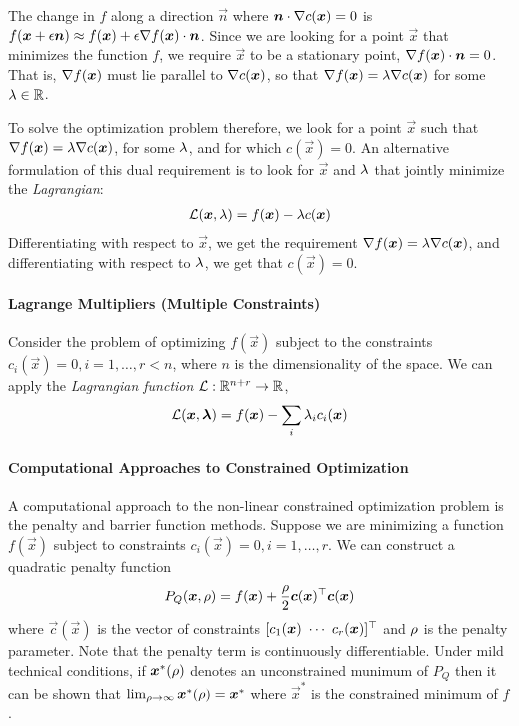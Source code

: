 The change in $f$ along a direction $\vec{n}$ where $\boldsymbol{n}\cdot\nabla c(\boldsymbol{x})=0$ is $f(\boldsymbol{x}+\epsilon\boldsymbol{n})\approx f(\boldsymbol{x})+\epsilon\nabla f(\boldsymbol{x})\cdot\boldsymbol{n}$. Since we are looking for a point $\vec{x}$ that minimizes the function $f$, we require $\vec{x}$ to be a stationary point, $\nabla f(\boldsymbol{x})\cdot\boldsymbol{n}=0$. That is, $\nabla f(\boldsymbol{x})$ must lie parallel to $\nabla c(\boldsymbol{x})$, so that $\nabla f(\boldsymbol{x})=\lambda\nabla c(\boldsymbol{x})$ for some $\lambda\in\mathbb{R}$.

To solve the optimization problem therefore, we look for a point $\vec{x}$ such that $\nabla f(\boldsymbol{x})=\lambda\nabla c(\boldsymbol{x})$, for some $\lambda$, and for which $c(\vec{x})=0$. An alternative formulation of this dual requirement is to look for $\vec{x}$ and $\lambda$ that jointly minimize the \emph{Lagrangian}:
\begin{align*}
	\mathcal{L}(\boldsymbol{x},\lambda)=f(\boldsymbol{x})-\lambda c(\boldsymbol{x})
\end{align*}
Differentiating with respect to $\vec{x}$, we get the requirement $\nabla f(\boldsymbol{x})=\lambda\nabla c(\boldsymbol{x})$, and differentiating with respect to $\lambda$, we get that $c(\vec{x})=0$.

\paragraph{Lagrange Multipliers (Multiple Constraints)}

Consider the problem of optimizing $f(\vec{x})$ subject to the constraints $c_i(\vec{x})=0,i=1,\dotsc,r<n$, where $n$ is the dimensionality of the space. We can apply the \emph{Lagrangian function} $\mathcal{L}:\mathbb{R}^{n+r}\to\mathbb{R}$,
\begin{align*}
	\mathcal{L}(\boldsymbol{x},\boldsymbol{\lambda})=f(\boldsymbol{x})-\sum_i\lambda_ic_i(\boldsymbol{x})
\end{align*}

\paragraph{Computational Approaches to Constrained Optimization}

A computational approach to the non-linear constrained optimization problem is the penalty and barrier function methods. Suppose we are minimizing a function $f(\vec{x})$ subject to constraints $c_i(\vec{x})=0,i=1,\dotsc,r$. We can construct a quadratic penalty function
\begin{align*}
	P_Q(\boldsymbol{x},\rho)=f(\boldsymbol{x})+\frac{\rho}{2}\boldsymbol{c}(\boldsymbol{x}){}^\top\boldsymbol{c}(\boldsymbol{x})
\end{align*}
where $\vec{c}(\vec{x})$ is the vector of constraints $[c_1(\vec{x})\ \cdots\ c_r(\vec{x})]\T$ and $\rho$ is the penalty parameter. Note that the penalty term is continuously differentiable. Under mild technical conditions, if $\boldsymbol{x}^*(\rho)$ denotes an unconstrained munimum of $P_Q$ then it can be shown that $\lim_{\rho\to\infty}\boldsymbol{x}^*(\rho)=\boldsymbol{x}^*$ where $\vec{x}^*$ is the constrained minimum of $f$.